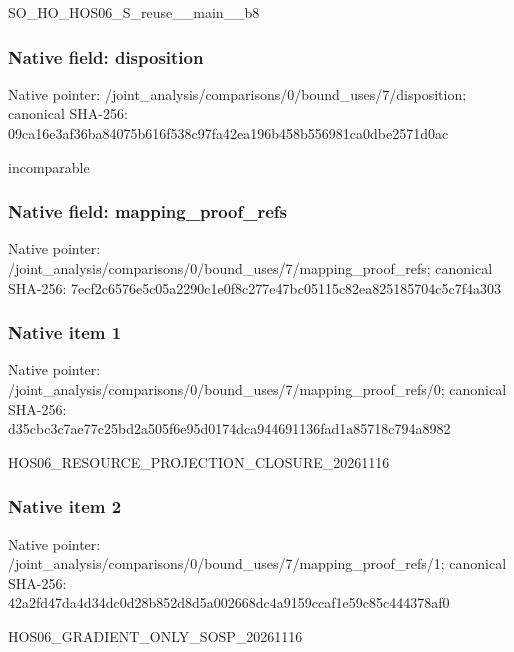 \documentclass[10pt,a4paper]{article}
\begin{document}
\begingroup\raggedright\sloppy SO\_\allowbreak{}HO\_\allowbreak{}HOS06\_\allowbreak{}S\_\allowbreak{}reuse\_\allowbreak{}\_\allowbreak{}main\_\allowbreak{}\_\allowbreak{}b8\par\endgroup

\subsubsection{Native field: disposition}
Native pointer: /joint\_\allowbreak{}analysis/comparisons/0/bound\_\allowbreak{}uses/7/disposition; canonical SHA-256: 09ca16e3af36ba84075b616f538c97fa42ea196b458b556981ca0dbe2571d0ac

\begingroup\raggedright\sloppy incomparable\par\endgroup

\subsubsection{Native field: mapping\_\allowbreak{}proof\_\allowbreak{}refs}
Native pointer: /joint\_\allowbreak{}analysis/comparisons/0/bound\_\allowbreak{}uses/7/mapping\_\allowbreak{}proof\_\allowbreak{}refs; canonical SHA-256: 7ecf2c6576e5c05a2290c1e0f8c277e47bc05115c82ea825185704c5c7f4a303

\subsubsection{Native item 1}
Native pointer: /joint\_\allowbreak{}analysis/comparisons/0/bound\_\allowbreak{}uses/7/mapping\_\allowbreak{}proof\_\allowbreak{}refs/0; canonical SHA-256: d35cbc3c7ae77c25bd2a505f6e95d0174dca944691136fad1a85718c794a8982

\begingroup\raggedright\sloppy HOS06\_\allowbreak{}RESOURCE\_\allowbreak{}PROJECTION\_\allowbreak{}CLOSURE\_\allowbreak{}20261116\par\endgroup

\subsubsection{Native item 2}
Native pointer: /joint\_\allowbreak{}analysis/comparisons/0/bound\_\allowbreak{}uses/7/mapping\_\allowbreak{}proof\_\allowbreak{}refs/1; canonical SHA-256: 42a2fd47da4d34dc0d28b852d8d5a002668dc4a9159ccaf1e59c85c444378af0

\begingroup\raggedright\sloppy HOS06\_\allowbreak{}GRADIENT\_\allowbreak{}ONLY\_\allowbreak{}SOSP\_\allowbreak{}20261116\par\endgroup
\end{document}
